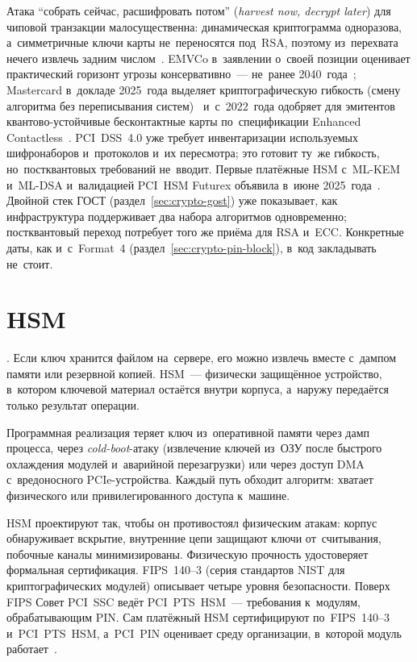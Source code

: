 Атака \enquote{собрать сейчас, расшифровать потом} (\textit{harvest now, decrypt later})
для чиповой транзакции малосущественна: динамическая криптограмма одноразова,
а~симметричные ключи карты не~переносятся под~RSA, поэтому из~перехвата нечего
извлечь задним числом~\cite{emvco-quantum-threat-2025}. EMVCo в~заявлении
о~своей позиции оценивает практический горизонт угрозы консервативно~--- не~ранее
2040~года~\cite{emvco-quantum-position,emvco-quantum-threat-2025}; Mastercard в~докладе 2025~года выделяет
криптографическую гибкость (смену алгоритма без переписывания систем)~\cite{mastercard-pqc-whitepaper}
и~с~2022~года одобряет для эмитентов квантово-устойчивые бесконтактные карты по~спецификации Enhanced
Contactless~\cite{mastercard-quantum-cards-2022}. PCI~DSS~4.0 уже требует
инвентаризации используемых шифронаборов и~протоколов и~их пересмотра; это
готовит ту~же гибкость, но~постквантовых требований не~вводит. Первые платёжные
HSM с~ML-KEM и~ML-DSA и~валидацией PCI~HSM Futurex объявила в~июне
2025~года~\cite{futurex-pqc-2025}.
Двойной стек ГОСТ (раздел~\ref{sec:crypto-gost}) уже показывает, как
инфраструктура поддерживает два набора алгоритмов одновременно; постквантовый
переход потребует того же приёма для RSA и~ECC. Конкретные даты, как и~с~Format~4
(раздел~\ref{sec:crypto-pin-block}), в~код закладывать не~стоит.

\FloatBarrier
\section{HSM}\label{sec:crypto-hsm}

. Если ключ хранится файлом на~сервере, его можно извлечь
вместе с~дампом памяти или резервной копией. HSM~--- физически защищённое
устройство, в~котором ключевой материал остаётся внутри корпуса, а~наружу
передаётся только результат операции.

Программная реализация теряет ключ из~оперативной памяти через
дамп процесса, через \textit{cold-boot}-атаку (извлечение ключей из~ОЗУ после
быстрого охлаждения модулей и~аварийной перезагрузки) или через доступ DMA
с~вредоносного PCIe-устройства. Каждый путь обходит алгоритм: хватает физического или привилегированного доступа к~машине.

HSM проектируют так, чтобы он противостоял физическим атакам: корпус обнаруживает
вскрытие, внутренние цепи защищают ключи от~считывания, побочные каналы
минимизированы.
Физическую прочность удостоверяет формальная сертификация. FIPS~140--3 (серия
стандартов NIST для криптографических модулей) описывает четыре уровня
безопасности. Поверх FIPS Совет PCI~SSC ведёт PCI~PTS~HSM~--- требования
к~модулям, обрабатывающим PIN. Сам платёжный HSM сертифицируют по~FIPS~140--3
и~PCI~PTS~HSM, а~PCI~PIN оценивает среду организации, в~которой модуль
работает~\cite{nist-fips-140-3,pci-pin-security,pci-pts-hsm}.

